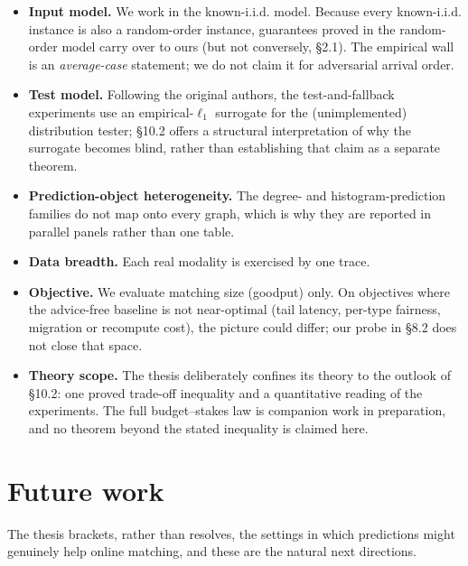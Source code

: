 \begin{itemize}
\tightlist
\item
  \textbf{Input model.} We work in the known-i.i.d. model. Because every
  known-i.i.d. instance is also a random-order instance, guarantees
  proved in the random-order model carry over to ours (but not
  conversely, §2.1). The empirical wall is an \emph{average-case}
  statement; we do not claim it for adversarial arrival order.
\item
  \textbf{Test model.} Following the original authors, the
  test-and-fallback experiments use an empirical-\(\ell_1\) surrogate
  for the (unimplemented) distribution tester; §10.2 offers a structural
  interpretation of why the surrogate becomes blind, rather than
  establishing that claim as a separate theorem.
\item
  \textbf{Prediction-object heterogeneity.} The degree- and
  histogram-prediction families do not map onto every graph, which is
  why they are reported in parallel panels rather than one table.
\item
  \textbf{Data breadth.} Each real modality is exercised by one trace.
\item
  \textbf{Objective.} We evaluate matching size (goodput) only. On
  objectives where the advice-free baseline is not near-optimal (tail
  latency, per-type fairness, migration or recompute cost), the picture
  could differ; our probe in §8.2 does not close that space.
\item
  \textbf{Theory scope.} The thesis deliberately confines its theory to
  the outlook of §10.2: one proved trade-off inequality and a
  quantitative reading of the experiments. The full budget--stakes law
  is companion work in preparation, and no theorem beyond the stated
  inequality is claimed here.
\end{itemize}

\section{Future work}

The thesis brackets, rather than resolves, the settings in which
predictions might genuinely help online matching, and these are the
natural next directions.

